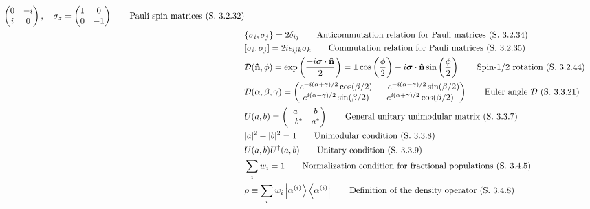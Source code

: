 \documentclass[10pt]{article}
\newcommand{\nhat}{\boldsymbol{\hat{\textbf{n}}}}
\newcommand{\ve}[1]{\boldsymbol{\mathbf{#1}}}
\newcommand{\lrp}[1]{\left( #1 \right)}
\newcommand{\herm}[1]{#1^\dagger}
\begin{document}
\begin{multicols}{2}
\begin{align*}
\begin{pmatrix}
			0 & -i \\
			i & 0 \\
		\end{pmatrix}, \quad \sigma_z = \begin{pmatrix}
			1 & 0 \\
			0 & -1 \\
		\end{pmatrix}	\tag*{Pauli spin matrices (S. 3.2.32)} \\
		& \{\sigma_i,\sigma_j\} = 2 \delta_{ij}	\tag*{Anticommutation relation for Pauli matrices (S. 3.2.34)} \\
		& [\sigma_i, \sigma_j] = 2 i \epsilon_{ijk} \sigma_k	\tag*{Commutation relation for Pauli matrices (S. 3.2.35)} \\
		& \mathcal{D}(\nhat,\phi) = \exp \lrp{\frac{-i \ve{\sigma} \cdot \nhat}{2}} = \ve{1} \cos \lrp{\frac{\phi}{2}} - i \ve{\sigma} \cdot \nhat \sin \lrp{\frac{\phi}{2}}	\tag*{Spin-1/2 rotation (S. 3.2.44)} \\
		& \mathcal{D}(\alpha, \beta, \gamma) = \begin{pmatrix}
			e^{-i(\alpha + \gamma)/2} \cos (\beta/2) & -e^{-i(\alpha - \gamma)/2} \sin (\beta/2) \\
			e^{i(\alpha - \gamma)/2} \sin (\beta/2) & e^{i(\alpha + \gamma)/2} \cos (\beta/2) \\
		\end{pmatrix}	\tag*{Euler angle $\mathcal{D}$ (S. 3.3.21)} \\
		& U(a,b) = \begin{pmatrix}
			a & b \\
			-b^* & a^* \\
		\end{pmatrix}	\tag*{General unitary unimodular matrix (S. 3.3.7)} \\
		& |a|^2 + |b|^2 = 1	\tag*{Unimodular condition (S. 3.3.8)} \\
		& U(a,b) \herm{U}(a,b)	\tag*{Unitary condition (S. 3.3.9)} \\
 		& \sum_i w_i = 1	\tag*{Normalization condition for fractional populations (S. 3.4.5)} \\
		& \rho \equiv \sum_i w_i \ket{\alpha^{(i)}} \bra{ \alpha^{(i)}}	\tag*{Definition of the density operator (S. 3.4.8)} \\
	\end{align*} \newpage
	\setlength{\abovedisplayskip}{-25pt}
	\setlength{\belowdisplayskip}{0pt}
	\setlength{\abovedisplayshortskip}{0pt}
	\setlength{\belowdisplayshortskip}{0pt}
	\begin{align*} 

\end{align*}
\end{multicols}
\end{document}

